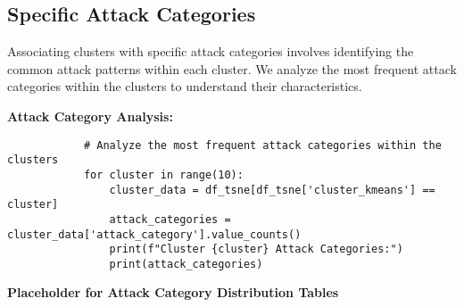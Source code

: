     \subsection{Specific Attack Categories}
    
        Associating clusters with specific attack categories involves identifying the common attack patterns within each cluster. We analyze the most frequent attack categories within the clusters to understand their characteristics.

        \textbf{Attack Category Analysis:}

        \begin{verbatim}
            # Analyze the most frequent attack categories within the clusters
            for cluster in range(10):
                cluster_data = df_tsne[df_tsne['cluster_kmeans'] == cluster]
                attack_categories = cluster_data['attack_category'].value_counts()
                print(f"Cluster {cluster} Attack Categories:")
                print(attack_categories)
        \end{verbatim}

        \textbf{Placeholder for Attack Category Distribution Tables}
